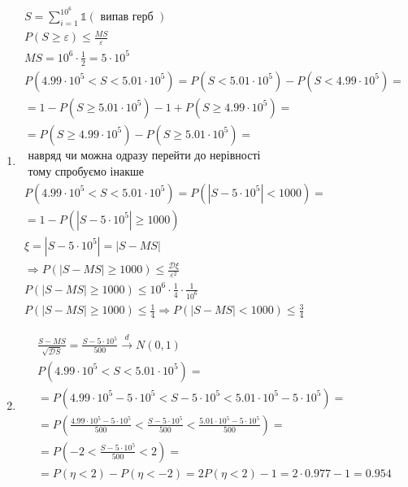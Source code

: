 \documentclass[12pt,letterpaper]{article}
\begin{document}
\begin{enumerate}
    \item 
        \begin{gather*}
            S = \sum_{i=1}^{10^6} \mathds{1}(\text{ випав герб }) \\
            P(S \geq \varepsilon) \leq \frac{M S}{\varepsilon} \\
            MS = 10^6 \cdot \frac{1}{2} = 5 \cdot 10^5 \\
            P(4.99 \cdot 10^5 < S < 5.01 \cdot 10^5) =
            P(S < 5.01 \cdot 10^5) - P(S < 4.99 \cdot 10^5) = \\
            = 1 - P(S \geq 5.01 \cdot 10^5) - 1 + P(S \geq 4.99 \cdot 10^5) = \\
            = P(S \geq 4.99 \cdot 10^5) - P(S \geq 5.01 \cdot 10^5) = \\
            \text{ навряд чи можна одразу перейти до нерівності } \\
            \text{ тому спробуємо інакше } \\
            P \left( 4.99 \cdot 10^5 < S < 5.01 \cdot 10^5 \right) = P(\left| S - 5 \cdot 10^5 \right| < 1000 ) = \\
            = 1 - P(\left| S - 5 \cdot 10^5 \right| \geq 1000 )\\
            \xi = \left| S - 5 \cdot 10^5 \right| = \left| S - M S \right|  \\
            \Rightarrow P(\left| S - M S \right| \geq 1000) \leq \frac{\mathcal{D}\xi}{\varepsilon^2} \\
            P(\left| S - M S \right| \geq 1000) \leq 10^6 \cdot \frac{1}{4} \cdot \frac{1}{10^6} \\
            P(\left| S - M S \right| \geq 1000) \leq \frac{1}{4}
            \Rightarrow P(\left| S - M S \right| < 1000 ) \leq \frac{3}{4}
        \end{gather*}
    \item 
        \begin{gather*}
            \frac{S - MS}{\sqrt{\mathcal{D}S}} = \frac{S - 5 \cdot 10^5}{500} \xrightarrow{d} N(0, 1) \\
            P(4.99 \cdot 10^5 < S < 5.01 \cdot 10^5) = \\
            = P(4.99 \cdot 10^5 - 5 \cdot 10^5 < S - 5 \cdot 10^5 < 5.01 \cdot 10^5 - 5 \cdot 10^5) = \\
            = P\left(\frac{4.99 \cdot 10^5 - 5 \cdot 10^5}{500} < \frac{S - 5 \cdot 10^5}{500} < \frac{5.01 \cdot 10^5 - 5 \cdot 10^5}{500}\right) = \\
            = P\left( -2 < \frac{S - 5 \cdot 10^5}{500} < 2 \right) = \\
            = P(\eta < 2) - P(\eta < - 2) = 2 P (\eta < 2) - 1 = 
            2 \cdot 0.977 - 1 = 0.954
        \end{gather*}
\end{enumerate}
\end{document}
